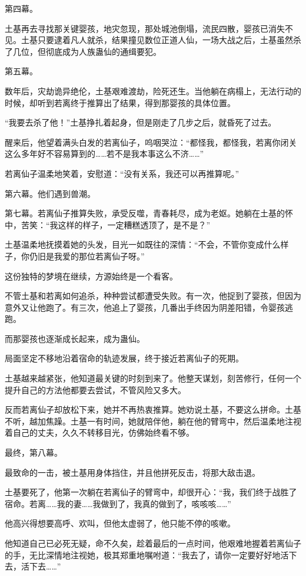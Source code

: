\begin{this_body}
第四幕。

土基再去寻找那关键婴孩，地灾忽现，那处城池倒塌，流民四散，婴孩已消失不见。土基只要逮着凡人就杀，结果撞见数位正道人仙，一场大战之后，土基虽然杀了几位，但彻底成为人族蛊仙的通缉要犯。

第五幕。

数年后，灾劫诡异绝伦，土基艰难渡劫，险死还生。当他躺在病榻上，无法行动的时候，却听到若离终于推算出了结果，得到那婴孩的具体位置。

“我要去杀了他！”土基挣扎着起身，但是刚走了几步之后，就昏死了过去。

醒来后，他望着满头白发的若离仙子，呜咽哭泣：“都怪我，都怪我，若离你闭关这么多年好不容易算到的……若不是我本事这么不济……”

若离仙子温柔地笑着，安慰道：“没有关系，我还可以再推算呢。”

第六幕。他们遇到兽潮。

第七幕。若离仙子推算失败，承受反噬，青春耗尽，成为老妪。她躺在土基的怀中，苦笑：“我这样的样子，一定糟糕透顶了，是不是？”

土基温柔地抚摸着她的头发，目光一如既往的深情：“不会，不管你变成什么样子，你仍旧是我爱的那位若离仙子呀。”

这份独特的梦境在继续，方源始终是一个看客。

不管土基和若离如何追杀，种种尝试都遭受失败。有一次，他捉到了婴孩，但因为意外又让他跑了。有三次，他追上了婴孩，几番出手终因为阴差阳错，令婴孩逃跑。

而那婴孩也逐渐成长起来，成为蛊仙。

局面坚定不移地沿着宿命的轨迹发展，终于接近若离仙子的死期。

土基越来越紧张，他知道最关键的时刻到来了。他整天谋划，刻苦修行，任何一个提升自己的方法他都要去尝试，不管风险又多大。

反而若离仙子却放松下来，她并不再热衷推算。她劝说土基，不要这么拼命。土基不听，越加焦躁。土基一有时间，她就陪伴他，躺在他的臂弯中，然后温柔地注视着自己的丈夫，久久不转移目光，仿佛始终看不够。

最终，第八幕。

最致命的一击，被土基用身体挡住，并且他拼死反击，将那大敌击退。

土基要死了，他第一次躺在若离仙子的臂弯中，却很开心：“我，我们终于战胜了宿命。若离……我的妻……我做到了，我真的做到了，咳咳咳……”

他高兴得想要高呼、欢叫，但他太虚弱了，他只能不停的咳嗽。

他知道自己已必死无疑，命不久矣，趁着最后的一点时间，他艰难地握着若离仙子的手，无比深情地注视她，极其郑重地嘱咐道：“我去了，请你一定要好好地活下去，活下去……”


\end{this_body}

